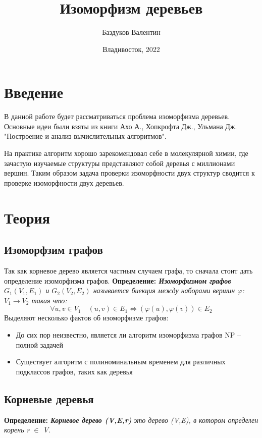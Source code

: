 \documentclass{article}
\title{Изоморфизм деревьев}
\author{Баздуков Валентин}
\date{Владивосток, 2022}
\begin{document}
	
	\maketitle
	\newpage
	\tableofcontents
	\newpage
	\section{Введение}
	
	В данной работе будет рассматриваться проблема изоморфизма деревьев. Основные идеи были взяты из книги Ахо А., Хопкрофта Дж., Ульмана Дж. "Построение и анализ вычислительных алгоритмов".
	
	На практике алгоритм хорошо зарекомендовал себе в молекулярной химии, где зачастую изучаемые структуры представляют собой деревья с миллионами вершин. Таким образом задача проверки изоморфности двух структур сводится к проверке изоморфности двух деревьев.
	\section{Теория}
	\subsection{Изоморфзим графов}
	Так как корневое дерево является частным случаем графа, то сначала стоит дать определение изоморфизма графов.
	\newline
	\newline
	\textbf{Определение: \textit {Изоморфизмом графов}} 
	\textit{$G_{1}(V_{1},E_{1})$ и $G_{2}(V_{2},E_{2})$ называется биекция между наборами вершин $\varphi$: $V_{1} \rightarrow V_{2}$ такая что: }
	\textit{$$\forall u,v \in V_{1} \quad (u,v) \in E_{1} \Leftrightarrow (\varphi(u), \varphi(v)) \in E_{2}$$}
	\newline
	Выделяют несколько фактов об изоморфизме графов:
	\begin{itemize}
		\item До сих пор неизвестно, является ли алгоритм изоморфизма графов NP -- полной задачей
		\item Существует алгоритм с полиноминальным временем для различных подклассов графов, таких как деревья
	\end{itemize}
	\subsection{Корневые деревья}
	\textbf{Определение: \textit {Корневое дерево (V,E,\textit{r})}} 
	\textit{это дерево (V,E), в котором определен корень r $\in$ V.}
	
\end{document}
